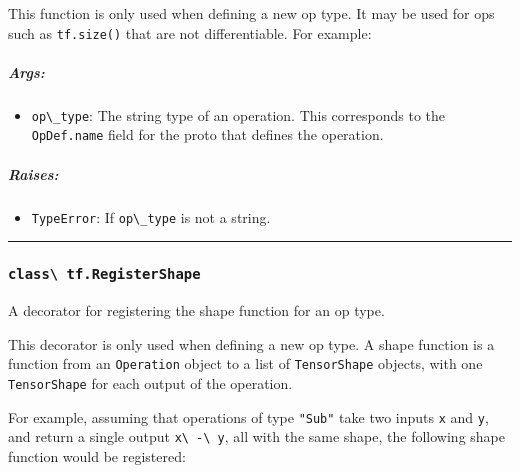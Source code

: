 This function is only used when defining a new op type. It may be used
for ops such as \lstinline{tf.size()} that are not differentiable. For
example:

\begin{Shaded}
\begin{Highlighting}[]
\NormalTok{)}
\end{Highlighting}
\end{Shaded}

\subparagraph{Args: }\label{args-29}

\begin{itemize}
\tightlist
\item
  \lstinline{op\_type}: The string type of an operation. This corresponds
  to the \lstinline{OpDef.name} field for the proto that defines the
  operation.
\end{itemize}

\subparagraph{Raises: }\label{raises-16}

\begin{itemize}
\tightlist
\item
  \lstinline{TypeError}: If \lstinline{op\_type} is not a string.
\end{itemize}

\begin{center}\rule{0.5\linewidth}{\linethickness}\end{center}

\subsubsection{\texorpdfstring{\lstinline{class\ tf.RegisterShape}
}{class tf.RegisterShape }}\label{class-tf.registershape}

A decorator for registering the shape function for an op type.

This decorator is only used when defining a new op type. A shape
function is a function from an \lstinline{Operation} object to a list of
\lstinline{TensorShape} objects, with one \lstinline{TensorShape} for each
output of the operation.

For example, assuming that operations of type \lstinline{"Sub"} take two
inputs \lstinline{x} and \lstinline{y}, and return a single output
\lstinline{x\ -\ y}, all with the same shape, the following shape function
would be registered:

\begin{Shaded}
\begin{Highlighting}[]
\NormalTok{(}\NormalTok{)}
 
   \NormalTok{[op.inputs[}\NormalTok{].get_shape().merge_with(op.inputs[}\NormalTok{].get_shape())]}
\end{Highlighting}
\end{Shaded}

